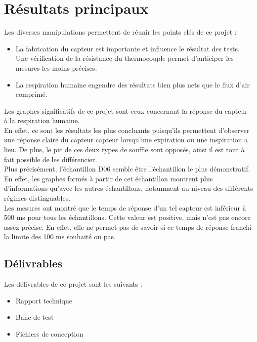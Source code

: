 \section{Résultats principaux}
Les diverses manipulations permettent de réunir les points clés de ce projet :
\begin{itemize}
    \item La fabrication du capteur est importante et influence le résultat des tests. Une vérification de la résistance du thermocouple permet
          d'anticiper les mesures les moins précises. 
    \item La respiration humaine engendre des résultats bien plus nets que le flux d'air comprimé.
\end{itemize}
Les graphes significatifs de ce projet sont ceux concernant la réponse du capteur à la respiration humaine. \\
En effet, ce sont les résultats les plus concluants puisqu'ils permettent d'observer une réponse claire du capteur \gls{capteur} lorsqu'une 
expiration ou une inspiration a lieu. De plus, le pic de ces deux types de souffle sont opposés, ainsi il est tout à fait possible de les 
différencier. \\
Plus précisément, l'échantillon D06 semble être l'échantillon le plus démonstratif. En effet, les graphes formés à partir de cet échantillon 
montrent plus d'informations qu'avec les autres échantillons, notamment au niveau des différents régimes distinguables. \\
Les mesures ont montré que le temps de réponse d'un tel capteur est inférieur à 500 ms pour tous les échantillons. Cette valeur est positive, mais 
n'est pas encore assez précise. En effet, elle ne permet pas de savoir si ce temps de réponse franchi la limite des 100 ms souhaité ou pas. 

\subsection{Délivrables}
Les délivrables de ce projet sont les suivants :
\begin{itemize}
    \item Rapport technique
    \item Banc de test
    \item Fichiers de conception
\end{itemize}

